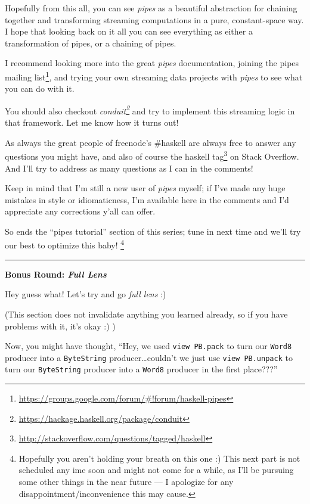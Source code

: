 \documentclass[]{article}
\renewcommand{\href}[2]{#2\footnote{\url{#1}}}
\begin{document}
Hopefully from this all, you can see \emph{pipes} as a beautiful abstraction for
chaining together and transforming streaming computations in a pure,
constant-space way. I hope that looking back on it all you can see everything as
either a transformation of pipes, or a chaining of pipes.

I recommend looking more into the great \emph{pipes} documentation, joining the
\href{https://groups.google.com/forum/\#!forum/haskell-pipes}{pipes mailing
list}, and trying your own streaming data projects with \emph{pipes} to see what
you can do with it.

You should also checkout
\emph{\href{https://hackage.haskell.org/package/conduit}{conduit}} and try to
implement this streaming logic in that framework. Let me know how it turns out!

As always the great people of freenode's \#haskell are always free to answer any
questions you might have, and also of course the
\href{http://stackoverflow.com/questions/tagged/haskell}{haskell tag} on Stack
Overflow. And I'll try to address as many questions as I can in the comments!

Keep in mind that I'm still a new user of \emph{pipes} myself; if I've made any
huge mistakes in style or idiomaticness, I'm available here in the comments and
I'd appreciate any corrections y'all can offer.

So ends the ``pipes tutorial'' section of this series; tune in next time and
we'll try our best to optimize this baby! \footnote{Hopefully you aren't holding
  your breath on this one :) This next part is not scheduled any ime soon and
  might not come for a while, as I'll be pursuing some other things in the near
  future --- I apologize for any disappointment/inconvenience this may cause.}

\begin{center}\rule{0.5\linewidth}{\linethickness}\end{center}

\textbf{Bonus Round: \emph{Full Lens}}

Hey guess what! Let's try and go \emph{full lens} :)

(This section does not invalidate anything you learned already, so if you have
problems with it, it's okay :) )

Now, you might have thought, ``Hey, we used \texttt{view\ PB.pack} to turn our
\texttt{Word8} producer into a \texttt{ByteString} producer\ldots{}couldn't we
just use \texttt{view\ PB.unpack} to turn our \texttt{ByteString} producer into
a \texttt{Word8} producer in the first place???''
\end{document}
